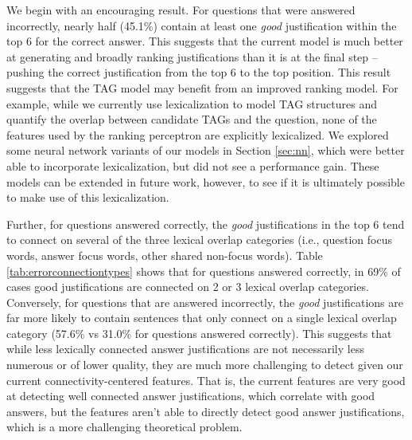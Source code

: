 {}
We begin with an encouraging result. For questions that were answered incorrectly, nearly half (45.1\%) contain at least one \emph{good} justification within the top 6 for the correct answer.  This suggests that the current model is much better at generating and broadly ranking justifications than it is at the final step -- pushing the correct justification from the top 6 to the top position.  This result suggests that the TAG model may benefit from an improved ranking model. For example, while we currently use lexicalization to model TAG structures and quantify the overlap between candidate TAGs and the question, none of the features used by the ranking perceptron are explicitly lexicalized. We explored some neural network variants of our models in Section \ref{sec:nn}, which were better able to incorporate lexicalization, but did not see a performance gain.  These models can be extended in future work, however, to see if it is ultimately possible to make use of this lexicalization.


Further, for questions answered correctly, the \emph{good} justifications in the top 6 tend to connect on several of the three lexical overlap categories (i.e., question focus words, answer focus words, other shared non-focus words).  Table \ref{tab:errorconnectiontypes} shows that for questions answered correctly, in 69\% of cases good justifications are connected on 2 or 3 lexical overlap categories.  
Conversely, for questions that are answered incorrectly, the \emph{good} justifications are far more likely to contain sentences that only connect on a single lexical overlap category (57.6\% vs 31.0\% for questions answered correctly). 
This suggests that while less lexically connected answer justifications are not necessarily less numerous or of lower quality, they are much more challenging to detect given our current connectivity-centered features.  That is, the current features are very good at detecting well connected answer justifications, which correlate with good answers, but the features aren't able to directly detect good answer justifications, which is a more challenging theoretical problem.




